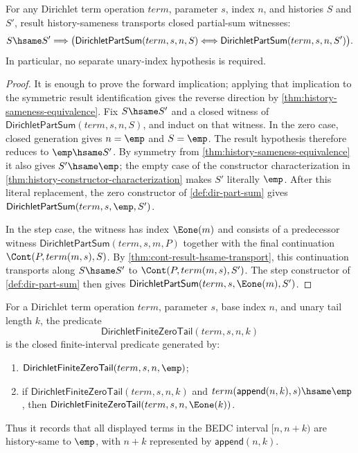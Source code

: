 \begin{theorem}
\label{thm:lfunction-dirichlet-part-sum-result-hsame-transport}
For any Dirichlet term operation $term$, parameter $s$, index $n$, and
histories $S$ and $S'$, result history-sameness transports closed
partial-sum witnesses:
$$
S\hsame S'
\Longrightarrow
\bigl(
\mathsf{DirichletPartSum}(term,s,n,S)
\Longleftrightarrow
\mathsf{DirichletPartSum}(term,s,n,S')
\bigr).
$$
In particular, no separate unary-index hypothesis is required.
\end{theorem}
\begin{proof}
It is enough to prove the forward implication; applying that implication to
the symmetric result identification gives the reverse direction by
\autoref{thm:history-sameness-equivalence}. Fix $S\hsame S'$ and a closed
witness of $\mathsf{DirichletPartSum}(term,s,n,S)$, and induct on that
witness. In the zero case, closed generation gives $n=\emp$ and $S=\emp$.
The result hypothesis therefore reduces to $\emp\hsame S'$. By symmetry from
\autoref{thm:history-sameness-equivalence} it also gives $S'\hsame\emp$; the
empty case of the constructor characterization in
\autoref{thm:history-constructor-characterization} makes $S'$ literally
$\emp$. After this literal replacement, the zero constructor of
\autoref{def:dir-part-sum} gives
$\mathsf{DirichletPartSum}(term,s,\emp,S')$.

In the step case, the witness has index $\Eone(m)$ and consists of a
predecessor witness $\mathsf{DirichletPartSum}(term,s,m,P)$ together with the
final continuation $\Cont(P,term(m,s),S)$. By
\autoref{thm:cont-result-hsame-transport}, this continuation transports along
$S\hsame S'$ to $\Cont(P,term(m,s),S')$. The step constructor of
\autoref{def:dir-part-sum} then gives
$\mathsf{DirichletPartSum}(term,s,\Eone(m),S')$.
\end{proof}

\begin{definition}
\label{def:lfunction-dirichlet-finite-zero-tail}
For a Dirichlet term operation $term$, parameter $s$, base index $n$, and unary tail length $k$, the predicate
$$
\mathsf{DirichletFiniteZeroTail}(term,s,n,k)
$$
is the closed finite-interval predicate generated by:
\begin{enumerate}
  \item $\mathsf{DirichletFiniteZeroTail}(term,s,n,\emp)$;
  \item if $\mathsf{DirichletFiniteZeroTail}(term,s,n,k)$ and $term(\mathsf{append}(n,k),s)\hsame\emp$, then $\mathsf{DirichletFiniteZeroTail}(term,s,n,\Eone(k))$.
\end{enumerate}
Thus it records that all displayed terms in the BEDC interval $[n,n+k)$ are history-same to $\emp$, with $n+k$ represented by $\mathsf{append}(n,k)$.
\end{definition}

